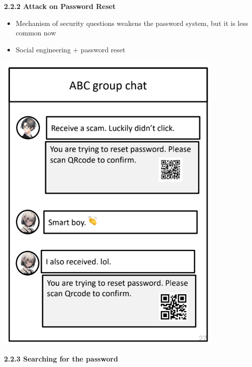 \documentclass[landscape,a4paper]{extarticle}
\newenvironment{Figure}
  {\par\noindent\minipage{\linewidth}}
  {\endminipage\par\medskip}
\begin{document}
\begin{multicols*}{5}
    \textbf{2.2.2 Attack on Password Reset}
    \begin{itemize}
        \item Mechanism of security questions weakens the password system, but it is less
        common now
        \item Social engineering + password reset
    \end{itemize}

    \begin{Figure}
        \centering
        \includegraphics[width=0.9\linewidth]{social_engineering_pw_reset.png}
    \end{Figure}

    \textbf{2.2.3 Searching for the password}


\end{multicols*}
\end{document}

